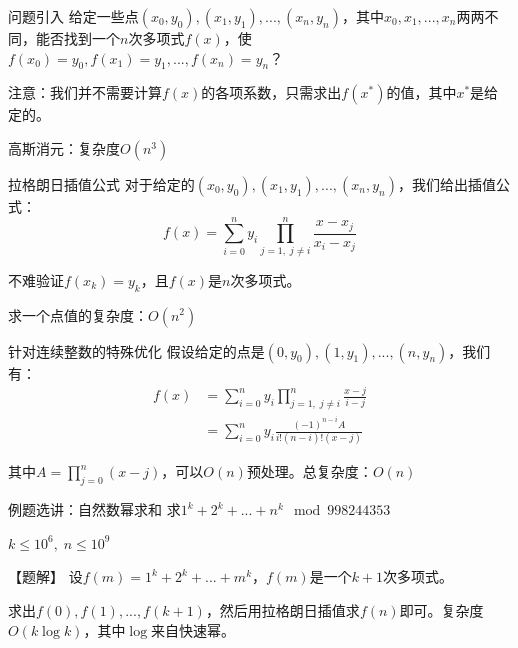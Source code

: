 \documentclass{beamer}
\begin{document}
\begin{frame}{问题引入}
    给定一些点$(x_0,y_0),(x_1,y_1),...,(x_n,y_n)$，其中$x_0,x_1,...,x_n$两两不同，能否找到一个$n$次多项式$f(x)$，使$f(x_0)=y_0,f(x_1)=y_1,...,f(x_n)=y_n$？

    \vspace{1em}
    注意：我们并不需要计算$f(x)$的各项系数，只需求出$f(x^*)$的值，其中$x^*$是给定的。

    \vspace{1em}
    \pause 高斯消元：复杂度$O(n^3)$
\end{frame}

\begin{frame}{拉格朗日插值公式}
    对于给定的$(x_0,y_0),(x_1,y_1),...,(x_n,y_n)$，我们给出插值公式：
    \begin{equation*}
        f(x)=\sum_{i=0}^n y_i \prod_{j=1,\;j\neq i}^n \frac{x-x_j}{x_i-x_j}
    \end{equation*}

    不难验证$f(x_k)=y_k$，且$f(x)$是$n$次多项式。

    \pause
    求一个点值的复杂度：$O(n^2)$
\end{frame}

\begin{frame}{针对连续整数的特殊优化}
    假设给定的点是$(0,y_0),(1,y_1),...,(n,y_n)$，我们有：
    \begin{align*}
        f(x)&= \sum_{i=0}^n y_i \prod_{j=1,\;j\neq i}^n \frac{x-j}{i-j}\\
        &= \sum_{i=0}^n y_i \frac{(-1)^{n-i}A}{i!(n-i)!(x-j)}
    \end{align*}

    其中$A=\prod_{j=0}^n(x-j)$，可以$O(n)$预处理。总复杂度：$O(n)$
\end{frame}

\begin{frame}{例题选讲：自然数幂求和}
    求$1^k+2^k+...+n^k \mod 998244353$

    $k\leq 10^6,\;n\leq 10^9$

    \pause
    \vspace{1em}
    【题解】 设$f(m)=1^k+2^k+...+m^k$，$f(m)$是一个$k+1$次多项式。

    \pause
    \vspace{1em}
    求出$f(0),f(1),...,f(k+1)$，然后用拉格朗日插值求$f(n)$即可。复杂度$O(k\log k)$，其中$\log$来自快速幂。

\end{frame}
\end{document}
